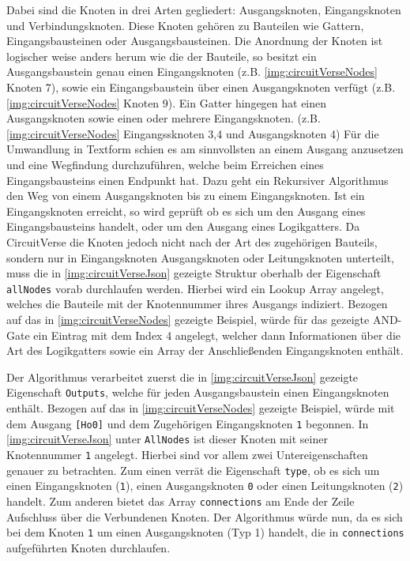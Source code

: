  Dabei sind die Knoten in drei Arten gegliedert: Ausgangsknoten, Eingangsknoten und Verbindungsknoten. Diese Knoten gehören zu Bauteilen wie Gattern, Eingangsbausteinen oder Ausgangsbausteinen. Die Anordnung der Knoten ist logischer weise anders herum wie die der Bauteile, so besitzt ein Ausgangsbaustein genau einen Eingangsknoten (z.B. \autoref{img:circuitVerseNodes} Knoten 7), sowie ein Eingangsbaustein über einen Ausgangsknoten verfügt (z.B. \autoref{img:circuitVerseNodes} Knoten 9). Ein Gatter hingegen hat einen Ausgangsknoten sowie einen oder mehrere Eingangsknoten. (z.B. \autoref{img:circuitVerseNodes} Eingangssknoten 3,4 und Ausgangsknoten 4) Für die Umwandlung in Textform schien es am sinnvollsten an einem Ausgang anzusetzen und eine Wegfindung durchzuführen, welche beim Erreichen eines Eingangsbausteins einen Endpunkt hat. Dazu geht ein Rekursiver Algorithmus den Weg von einem Ausgangsknoten bis zu einem Eingangsknoten. Ist ein Eingangsknoten erreicht, so wird geprüft ob es sich um den Ausgang eines Eingangsbausteins handelt, oder um den Ausgang eines Logikgatters. Da CircuitVerse die Knoten jedoch nicht nach der Art des zugehörigen Bauteils, sondern nur in Eingangsknoten Ausgangsknoten oder Leitungsknoten unterteilt, muss die in \ref{img:circuitVerseJson} gezeigte Struktur oberhalb der Eigenschaft \texttt{allNodes} vorab durchlaufen werden. Hierbei wird ein Lookup Array angelegt, welches die Bauteile mit der Knotennummer ihres Ausgangs indiziert. Bezogen auf das in \ref{img:circuitVerseNodes} gezeigte Beispiel, würde für das gezeigte AND-Gate ein Eintrag mit dem Index 4 angelegt, welcher dann Informationen über die Art des Logikgatters sowie ein Array der Anschließenden Eingangsknoten enthält. 
 
 Der Algorithmus verarbeitet zuerst die in \ref{img:circuitVerseJson} gezeigte Eigenschaft \texttt{Outputs}, welche für jeden Ausgangsbaustein einen Eingangsknoten enthält. Bezogen auf das in \ref{img:circuitVerseNodes} gezeigte Beispiel, würde mit dem Ausgang \texttt{[Ho0]} und dem Zugehörigen Eingangsknoten \texttt{1} begonnen. In \autoref{img:circuitVerseJson} unter \texttt{AllNodes} ist dieser Knoten mit seiner Knotennummer \texttt{1} angelegt. Hierbei sind vor allem zwei Untereigenschaften genauer zu betrachten. Zum einen verrät die Eigenschaft \texttt{type}, ob es sich um einen Eingangsknoten (\texttt{1}), einen Ausgangsknoten \texttt{0} oder einen Leitungsknoten (\texttt{2}) handelt. Zum anderen bietet das Array \texttt{connections} am Ende der Zeile Aufschluss über die Verbundenen Knoten. Der Algorithmus würde nun, da es sich bei dem Knoten \texttt{1} um einen Ausgangsknoten (Typ 1) handelt, die in \texttt{connections} aufgeführten Knoten durchlaufen. 
 
